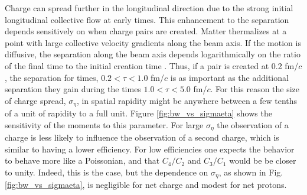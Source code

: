 Charge can spread further in the longitudinal direction due to the strong initial longitudinal collective flow at early times. This enhancement to the separation depends sensitively on when charge pairs are created. Matter thermalizes at a point with large collective velocity gradients along the beam axis. If the motion is diffusive, the separation along the beam axis depends logarithmically on the ratio of the final time to the initial creation time \cite{Bass:2000az}.  Thus, if a pair is created at 0.2 fm/$c$, the separation for times, $0.2<\tau<1.0$ fm/$c$ is as important as the additional separation they gain during the times $1.0<\tau<5.0$ fm/$c$. For this reason the size of charge spread, $\sigma_\eta$, in spatial rapidity might be anywhere between a few tenths of a unit of rapidity to a full unit. Figure \ref{fig:bw_vs_sigmaeta} shows the sensitivity of the moments to this parameter. For large $\sigma_\eta$ the observation of a charge is less likely to influence the observation of a second charge, which is similar to having a lower efficiency. For low efficiencies one expects the behavior to behave more like a Poissonian, and that $C_4/C_2$ and $C_3/C_1$ would be be closer to unity. Indeed, this is the case, but the dependence on $\sigma_\eta$, as shown in Fig. \ref{fig:bw_vs_sigmaeta}, is negligible for net charge and modest for net protons.
